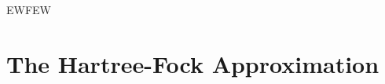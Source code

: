 \documentclass[UTF8]{ctexart}
\begin{document}
	\subsection{}
	
	\subsection{}
	
	\subsection{}
	
	\subsection{}
	
	\subsection{}
	
	\subsection{}
	
	\subsection{}
	
	\subsection{}
	
	\subsection{}
	
	\subsection{}
	
		EWFEW

\section{The Hartree-Fock Approximation}
	\subsection{}
	
\end{document}
